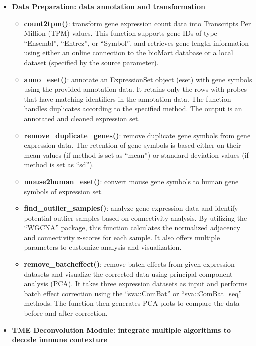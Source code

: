\documentclass[
  12pt,
]{book}
\providecommand{\tightlist}{%
  \setlength{\itemsep}{0pt}\setlength{\parskip}{0pt}}
\begin{document}
\begin{itemize}
\item
  \textbf{Data Preparation: data annotation and transformation}

  \begin{itemize}
  \tightlist
  \item
    \textbf{count2tpm()}: transform gene expression count data into Transcripts Per Million (TPM) values. This function supports gene IDs of type ``Ensembl'', ``Entrez'', or ``Symbol'', and retrieves gene length information using either an online connection to the bioMart database or a local dataset (specified by the source parameter).
  \item
    \textbf{anno\_eset()}: annotate an ExpressionSet object (eset) with gene symbols using the provided annotation data. It retains only the rows with probes that have matching identifiers in the annotation data. The function handles duplicates according to the specified method. The output is an annotated and cleaned expression set.
  \item
    \textbf{remove\_duplicate\_genes()}: remove duplicate gene symbols from gene expression data. The retention of gene symbols is based either on their mean values (if method is set as ``mean'') or standard deviation values (if method is set as ``sd'').
  \item
    \textbf{mouse2human\_eset()}: convert mouse gene symbols to human gene symbols of expression set.
  \item
    \textbf{find\_outlier\_samples()}: analyze gene expression data and identify potential outlier samples based on connectivity analysis. By utilizing the ``WGCNA'' package, this function calculates the normalized adjacency and connectivity z-scores for each sample. It also offers multiple parameters to customize analysis and visualization.
  \item
    \textbf{remove\_batcheffect()}: remove batch effects from given expression datasets and visualize the corrected data using principal component analysis (PCA). It takes three expression datasets as input and performs batch effect correction using the ``sva::ComBat'' or ``sva::ComBat\_seq'' methods. The function then generates PCA plots to compare the data before and after correction.
  \end{itemize}
\item
  \textbf{TME Deconvolution Module: integrate multiple algorithms to decode immune contexture}


\end{itemize}
\end{document}
